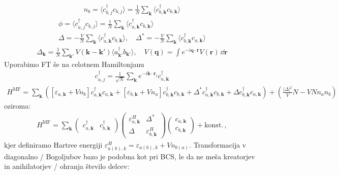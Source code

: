 \documentclass[a4paper,10pt]{article}
\renewcommand{\vec}[1]{\mathbf{#1}}
\begin{document}
\begin{align}
  n_b = \langle c_{b,j}^\dagger c_{b,j} \rangle = \frac{1}{N} \sum_{\vec{k}} \langle c_{b,\vec{k}}^\dagger c_{b,\vec{k}} \rangle
\end{align}
\begin{align}
  \phi = \langle c_{a,j}^\dagger c_{b,j} \rangle = \frac{1}{N} \sum_{\vec{k}} \langle c_{a,\vec{k}}^\dagger c_{b,\vec{k}} \rangle \\
  \Delta = -\frac{V}{N} \sum_{\vec{k}} \langle c_{a,\vec{k}}^\dagger c_{b,\vec{k}} \rangle, \quad \Delta^* = -\frac{V}{N} \sum_{\vec{k}} \langle c_{b,\vec{k}}^\dagger c_{a,\vec{k}} \rangle
\end{align}
\begin{align}
  \Delta_\vec{k} = \frac{1}{N} \sum_{\vec{k}'} V(\vec{k} - \vec{k}') \langle a_{\vec{k}'}^\dagger b_{\vec{k}'} \rangle, \quad V(\vec{q}) = \int e^{-i \vec{q} \cdot \vec{r}} V(\vec{r}) \, \dd{\vec{r}}
\end{align}
Uporabimo FT še na celotnem Hamiltonjanu
\begin{align}
  c_{a,j}^\dagger = \frac{1}{\sqrt{N}} \sum_{\vec{k}} e^{-i \vec{k} \cdot \vec{r}_j} c_{a,\vec{k}}^\dagger
\end{align}
\begin{align}
  H^{\text{MF}} = \sum_{\vec{k}} \left( [\varepsilon_{a,\vec{k}} + V n_b] c_{a,\vec{k}}^\dagger c_{a,\vec{k}} + [\varepsilon_{b,\vec{k}} + V n_a] c_{b,\vec{k}}^\dagger c_{b,\vec{k}} + \Delta^* c_{a,\vec{k}}^\dagger c_{b,\vec{k}} + \Delta c_{b,\vec{k}}^\dagger c_{a,\vec{k}} \right) + \left( \frac{\vert{}\Delta\vert{}^2}{V} N - V N n_a n_b \right)
\end{align}
oziroma: 
\begin{align}
  H^{\text{MF}} = \sum_{\vec{k}} \begin{pmatrix} c_{a,\vec{k}}^\dagger & c_{b,\vec{k}}^\dagger \end{pmatrix} \begin{pmatrix} {\varepsilon}^H_{a,\vec{k}} & \Delta^* \\ \Delta & {\varepsilon}^H_{b,\vec{k}} \end{pmatrix} \begin{pmatrix} c_{a,\vec{k}} \\ c_{b,\vec{k}} \end{pmatrix} + \text{konst.}\,,
\end{align}
kjer definiramo Hartree energiji ${\varepsilon}^H_{a(b),k} = \varepsilon_{a(b),k} + V n_{b(a)}$. Transformacija v diagonalno  / Bogoljubov bazo je podobna kot pri BCS, le da ne meša kreatorjev in anihilatorjev / ohranja število delcev:
\end{document}
